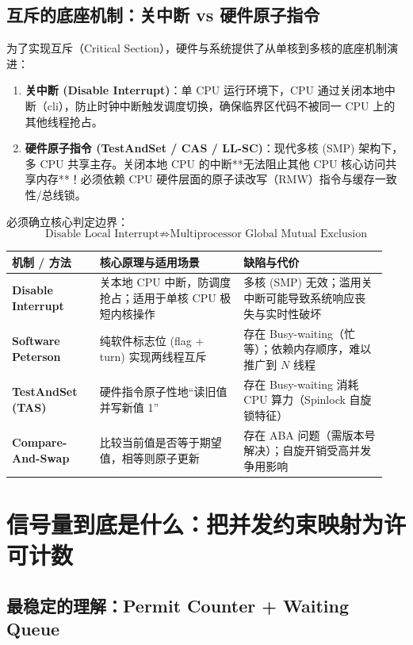 \documentclass[11pt,a4paper]{ctexart}
\newcommand{\kw}[1]{\textbf{#1}}
\begin{document}
\subsection{互斥的底座机制：关中断 vs 硬件原子指令}

为了实现互斥（Critical Section），硬件与系统提供了从单核到多核的底座机制演进：

\begin{enumerate}
  \item \kw{关中断 (Disable Interrupt)}：单 CPU 运行环境下，CPU 通过关闭本地中断（cli），防止时钟中断触发调度切换，确保临界区代码不被同一 CPU 上的其他线程抢占。
  \item \kw{硬件原子指令 (TestAndSet / CAS / LL-SC)}：现代多核 (SMP) 架构下，多 CPU 共享主存。关闭本地 CPU 的中断**无法阻止其他 CPU 核心访问共享内存**！必须依赖 CPU 硬件层面的原子读改写（RMW）指令与缓存一致性/总线锁。
\end{enumerate}

必须确立核心判定边界：
\[
\boxed{
\text{Disable Local Interrupt}
\not\Rightarrow
\text{Multiprocessor Global Mutual Exclusion}
}
\]

\begingroup
\small
\renewcommand{\arraystretch}{1.25}
\setlength{\tabcolsep}{6pt}
\begin{tabularx}{\linewidth}{>{\bfseries}p{0.22\linewidth} p{0.36\linewidth} p{0.36\linewidth}}
\toprule
机制 / 方法 & 核心原理与适用场景 & 缺陷与代价\\
\midrule
Disable Interrupt & 关本地 CPU 中断，防调度抢占；适用于单核 CPU 极短内核操作 & 多核 (SMP) 无效；滥用关中断可能导致系统响应丧失与实时性破坏\\
Software Peterson & 纯软件标志位 (flag + turn) 实现两线程互斥 & 存在 Busy-waiting（忙等）；依赖内存顺序，难以推广到 $N$ 线程\\
TestAndSet (TAS) & 硬件指令原子性地“读旧值并写新值 1” & 存在 Busy-waiting 消耗 CPU 算力（Spinlock 自旋锁特征）\\
Compare-And-Swap & 比较当前值是否等于期望值，相等则原子更新 & 存在 ABA 问题（需版本号解决）；自旋开销受高并发争用影响\\
\bottomrule
\end{tabularx}
\endgroup

\section{信号量到底是什么：把并发约束映射为许可计数}

\subsection{最稳定的理解：Permit Counter + Waiting Queue}
\end{document}
